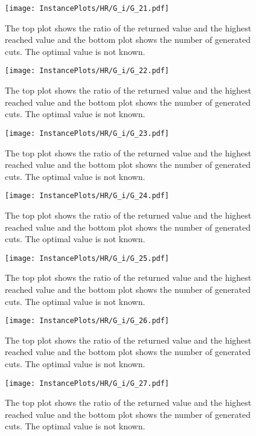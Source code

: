 \documentclass[10pt,a4paper]{article}
\begin{document}
\begin{figure}[H]
\texttt{[image: InstancePlots/HR/G\_i/G\_21.pdf]}
\caption{The top plot shows the ratio of the returned value and the highest reached value     and the bottom plot shows the number of generated cuts. The optimal value is not known.}
\end{figure}

\begin{figure}[H]
\texttt{[image: InstancePlots/HR/G\_i/G\_22.pdf]}
\caption{The top plot shows the ratio of the returned value and the highest reached value     and the bottom plot shows the number of generated cuts. The optimal value is not known.}
\end{figure}

\begin{figure}[H]
\texttt{[image: InstancePlots/HR/G\_i/G\_23.pdf]}
\caption{The top plot shows the ratio of the returned value and the highest reached value     and the bottom plot shows the number of generated cuts. The optimal value is not known.}
\end{figure}

\begin{figure}[H]
\texttt{[image: InstancePlots/HR/G\_i/G\_24.pdf]}
\caption{The top plot shows the ratio of the returned value and the highest reached value     and the bottom plot shows the number of generated cuts. The optimal value is not known.}
\end{figure}

\begin{figure}[H]
\texttt{[image: InstancePlots/HR/G\_i/G\_25.pdf]}
\caption{The top plot shows the ratio of the returned value and the highest reached value     and the bottom plot shows the number of generated cuts. The optimal value is not known.}
\end{figure}

\begin{figure}[H]
\texttt{[image: InstancePlots/HR/G\_i/G\_26.pdf]}
\caption{The top plot shows the ratio of the returned value and the highest reached value     and the bottom plot shows the number of generated cuts. The optimal value is not known.}
\end{figure}

\begin{figure}[H]
\texttt{[image: InstancePlots/HR/G\_i/G\_27.pdf]}
\caption{The top plot shows the ratio of the returned value and the highest reached value     and the bottom plot shows the number of generated cuts. The optimal value is not known.}
\end{figure}
\end{document}
